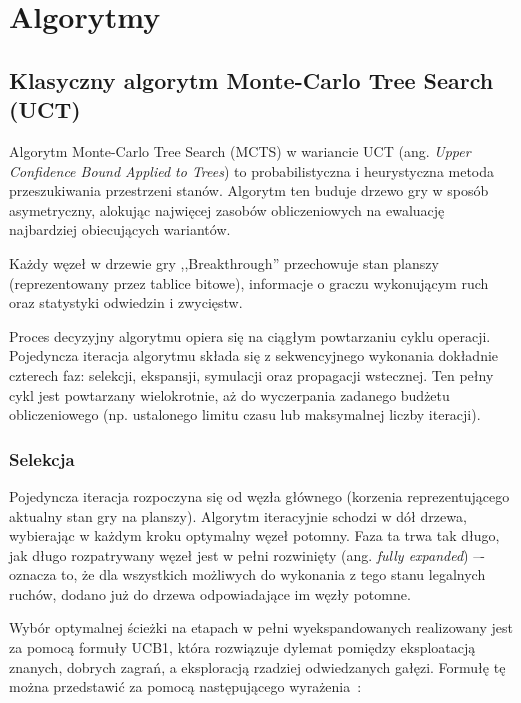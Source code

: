 \documentclass{article}
\begin{document}
\newpage

\section{Algorytmy}

\subsection{Klasyczny algorytm Monte-Carlo Tree Search (UCT)}

Algorytm Monte-Carlo Tree Search (MCTS) w wariancie UCT (ang. \textit{Upper Confidence Bound Applied to Trees}) to probabilistyczna i heurystyczna metoda przeszukiwania przestrzeni stanów. Algorytm ten buduje drzewo gry w sposób asymetryczny, alokując najwięcej zasobów obliczeniowych na ewaluację najbardziej obiecujących wariantów.

Każdy węzeł w drzewie gry ,,Breakthrough'' przechowuje stan planszy (reprezentowany przez tablice bitowe), informacje o graczu wykonującym ruch oraz statystyki odwiedzin i zwycięstw.

Proces decyzyjny algorytmu opiera się na ciągłym powtarzaniu cyklu operacji. Pojedyncza iteracja algorytmu składa się z sekwencyjnego wykonania dokładnie czterech faz: selekcji, ekspansji, symulacji oraz propagacji wstecznej. Ten pełny cykl jest powtarzany wielokrotnie, aż do wyczerpania zadanego budżetu obliczeniowego (np. ustalonego limitu czasu lub maksymalnej liczby iteracji).

\subsubsection{Selekcja}

Pojedyncza iteracja rozpoczyna się od węzła głównego (korzenia reprezentującego aktualny stan gry na planszy). Algorytm iteracyjnie schodzi w dół drzewa, wybierając w każdym kroku optymalny węzeł potomny. Faza ta trwa tak długo, jak długo rozpatrywany węzeł jest w pełni rozwinięty (ang. \textit{fully expanded}) –- oznacza to, że dla wszystkich możliwych do wykonania z tego stanu legalnych ruchów, dodano już do drzewa odpowiadające im węzły potomne.

Wybór optymalnej ścieżki na etapach w pełni wyekspandowanych realizowany jest za pomocą formuły UCB1, która rozwiązuje dylemat pomiędzy eksploatacją znanych, dobrych zagrań, a eksploracją rzadziej odwiedzanych gałęzi. Formułę tę można przedstawić za pomocą następującego wyrażenia~\cite{kocsis2006bandit}:
\end{document}
